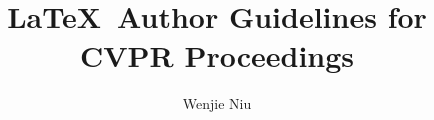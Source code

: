 \documentclass[10pt,twocolumn,letterpaper]{article}
\begin{document}
\title{\LaTeX\ Author Guidelines for CVPR Proceedings}

\author{Wenjie Niu}

\maketitle

{\small


}
\end{document}
